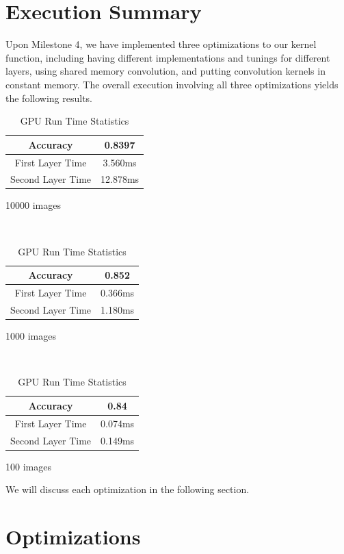 \documentclass{article}
\begin{document}
\section{Execution Summary}
Upon Milestone 4, we have implemented three optimizations to our kernel function, including having different
implementations and tunings for different layers, using shared memory convolution, and putting convolution
kernels in constant memory. The overall execution involving all three optimizations yields the following
results.

\begin{table}[H]
    \centering
    \begin{minipage}{.32\linewidth}
        \begin{tabular}{c|c}
            Accuracy & 0.8397 \\ \hline
            First Layer Time & 3.560ms \\ \hline
            Second Layer Time & 12.878ms
        \end{tabular}
        \caption*{10000 images}
    \end{minipage}
    ~
    \begin{minipage}{.32\linewidth}
        \begin{tabular}{c|c}
            Accuracy & 0.852 \\ \hline
            First Layer Time & 0.366ms \\ \hline
            Second Layer Time & 1.180ms
        \end{tabular}
        \caption*{1000 images}
    \end{minipage}
    ~
    \begin{minipage}{.32\linewidth}
        \begin{tabular}{c|c}
            Accuracy & 0.84 \\ \hline
            First Layer Time & 0.074ms \\ \hline
            Second Layer Time & 0.149ms
        \end{tabular}
        \caption*{100 images}
    \end{minipage}
    \caption{GPU Run Time Statistics}
\end{table}

We will discuss each optimization in the following section.

\section{Optimizations}
\end{document}
